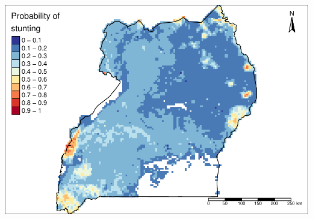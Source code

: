 \documentclass[11pt,]{article}
\begin{document}
\includegraphics{skeleton_files/figure-latex/maps-2.pdf}




\newpage
\singlespacing 

\end{document}
